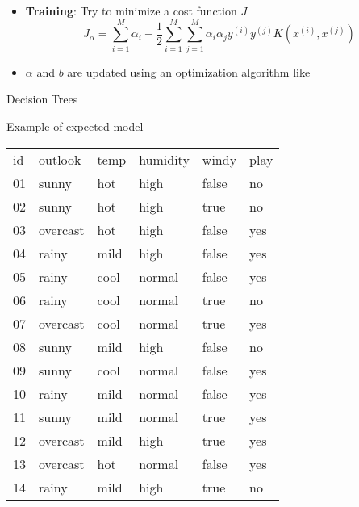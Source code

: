 \documentclass{KBook}
\begin{document}
	
	\begin{itemize}
		\item \textbf{Training}: Try to minimize a cost function $ J $
		\[J_\alpha = \sum\limits_{i=1}^{M} \alpha_i - \frac{1}{2} \sum\limits_{i=1}^{M} \sum\limits_{j=1}^{M} \alpha_i \alpha_j y^{(i)} y^{(j)} K(x^{(i)}, x^{(j)})\]
		\item $\alpha$ and $ b $ are updated using an optimization algorithm like 
	\end{itemize}
	
	Decision Trees
	
	Example of expected model
		\begin{minipage}{0.33\textwidth} 
			\tiny\bfseries
			\begin{tabular}{llllll}
					id & outlook & temp & humidity & windy & play \\
					01 & sunny & hot & high & false & no \\
					02 & sunny & hot & high & true & no \\
					03 & overcast & hot & high & false & yes \\
					04 & rainy & mild & high & false & yes \\
					05 & rainy & cool & normal & false & yes \\
					06 & rainy & cool & normal & true & no \\
					07 & overcast & cool & normal & true & yes \\
					08 & sunny & mild & high & false & no \\
					09 & sunny & cool & normal & false & yes \\
					10 & rainy & mild & normal & false & yes \\
					11 & sunny & mild & normal & true & yes \\
					12 & overcast & mild & high & true & yes \\
					13 & overcast & hot & normal & false & yes \\
					14 & rainy & mild & high & true & no \\
			\end{tabular}
		\end{minipage}
\end{document}
